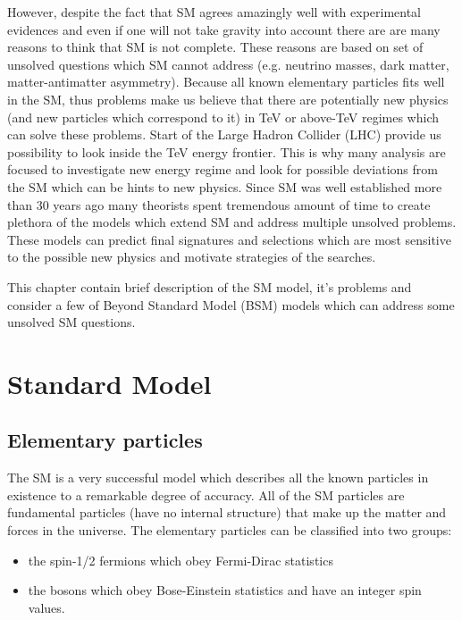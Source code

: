 However, despite the fact that SM agrees amazingly well with experimental evidences and even if one will not take gravity into account 
there are are many reasons to think that SM is not complete.
These reasons are based on set of unsolved questions which SM cannot address (e.g. neutrino masses, dark matter, matter-antimatter asymmetry).
Because all known elementary particles fits well in the SM, thus problems make us believe that there are
potentially new physics (and new particles which correspond to it) in TeV or above-TeV regimes which can solve these problems.
Start of the Large Hadron Collider (LHC) provide us possibility to look inside the TeV energy frontier.
This is why many analysis are focused to investigate new energy regime and look for possible deviations from the SM which can be hints to new physics.
Since SM was well established more than 30 years ago many theorists spent tremendous amount of time to create
plethora of the models which extend SM and address multiple unsolved problems. These models can predict final signatures and selections which are most sensitive to 
the possible new physics and motivate strategies of the searches.

This chapter contain brief description of the SM model, it's problems and consider a few of Beyond Standard Model (BSM) models which can address some unsolved SM questions.

\section{Standard Model}

\subsection{Elementary particles}


The SM is a very successful model which describes all the known particles in existence to a remarkable degree of accuracy.
All of the SM particles are fundamental particles (have no internal structure) that make up the matter and forces in the universe.
The elementary particles can be classified into two groups: 
\begin{itemize}
 \item the spin-1/2 fermions which obey Fermi-Dirac statistics
 \item the bosons which obey Bose-Einstein statistics and have an integer spin values.
\end{itemize}

